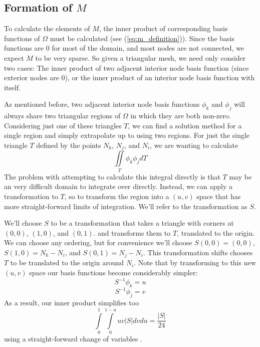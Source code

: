 \subsection{Formation of $M$}
To calculate the elements of $M$, the inner product of corresponding basis functions of $\Omega$ must be calculated
(see (\ref{eq:m_definition})). Since the basis functions are 0 for most of the domain, and most nodes are not
connected, we expect $M$ to be very sparse. So given a triangular mesh, we need only consider two cases: The inner
product of two adjacent interior node basis function (since exterior nodes are 0), or the inner product of an interior
node basis function with itself.

As mentioned before, two adjacent interior node basis functions $\phi_k$ and $\phi_j$ will always share two triangular
regions of $\Omega$ in which they are both non-zero. Considering just one of these triangles $T$, we can find a solution method for a
single region and simply extrapolate up to using two regions. For just the single triangle $T$ defined by the points
$N_k$, $N_j$, and $N_i$, we are wanting to calculate
\begin{equation}
\iint\limits_T \phi_k \phi_j dT
\end{equation}
The problem with attempting to calculate this integral directly is that $T$ may be an very difficult domain to integrate over
directly. Instead, we can apply a transformation to $T$, so to transform the region into a $(u,v)$ space that
has more straight-forward limits of integration. We'll refer to the transformation as $S$.

We'll choose $S$ to be a transformation that takes a triangle with corners at $(0,0)$, $(1,0)$, and $(0,1)$. and
transforms them to $T$, translated to the origin. We can choose any ordering, but for convenience we'll choose 
$S(0, 0) = (0,0)$, $S(1, 0) = N_k - N_i$, and $S(0, 1) = N_j - N_i$. This transformation shifts chooses $T$ to be
translated to the origin around $N_i$. Note that
by transforming to this new $(u,v)$ space our basis functions become considerably simpler:
\begin{equation}
S^{-1}\phi_k = u
\end{equation}
\begin{equation}
S^{-1}\phi_j = v
\end{equation}
As a result, our inner product simplifies too
\begin{equation}
\int\limits_0^1 \int\limits_0^{1-u} uv |S| dv du = \frac{|S|}{24}
\end{equation}
using a straight-forward change of variables \cite{change_of_variables}.

